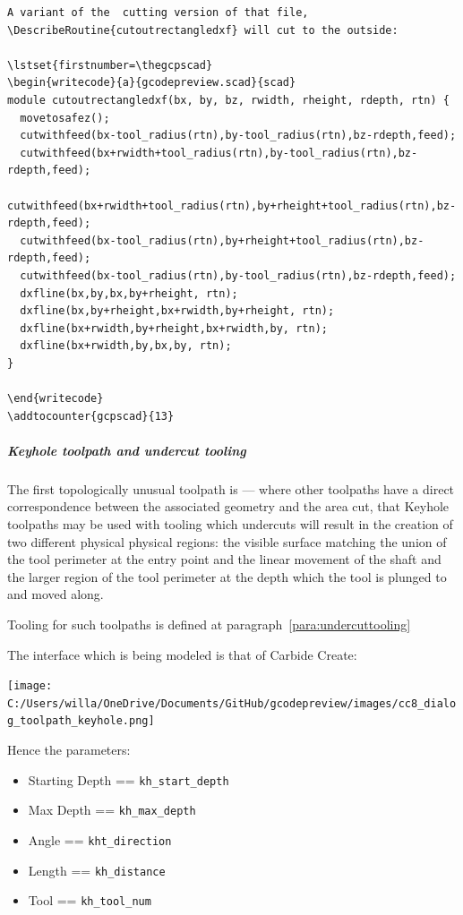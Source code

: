 \documentclass{ltxdoc}
\begin{document}
\begin{verbatim}
A variant of the  cutting version of that file, \DescribeRoutine{cutoutrectangledxf} will cut to the outside:

\lstset{firstnumber=\thegcpscad}
\begin{writecode}{a}{gcodepreview.scad}{scad}
module cutoutrectangledxf(bx, by, bz, rwidth, rheight, rdepth, rtn) {
  movetosafez();
  cutwithfeed(bx-tool_radius(rtn),by-tool_radius(rtn),bz-rdepth,feed);
  cutwithfeed(bx+rwidth+tool_radius(rtn),by-tool_radius(rtn),bz-rdepth,feed);
  cutwithfeed(bx+rwidth+tool_radius(rtn),by+rheight+tool_radius(rtn),bz-rdepth,feed);
  cutwithfeed(bx-tool_radius(rtn),by+rheight+tool_radius(rtn),bz-rdepth,feed);
  cutwithfeed(bx-tool_radius(rtn),by-tool_radius(rtn),bz-rdepth,feed);
  dxfline(bx,by,bx,by+rheight, rtn);
  dxfline(bx,by+rheight,bx+rwidth,by+rheight, rtn);
  dxfline(bx+rwidth,by+rheight,bx+rwidth,by, rtn);
  dxfline(bx+rwidth,by,bx,by, rtn);
}

\end{writecode}
\addtocounter{gcpscad}{13}
\end{verbatim}

\subparagraph{Keyhole toolpath and undercut tooling}
 
\label{subsec:keyholetoolpaths}
The first topologically unusual toolpath is  --- where other toolpaths have a direct correspondence between the associated geometry and the area cut, that Keyhole toolpaths may be used with tooling which undercuts will result in the creation of two different physical physical regions: the visible surface matching the union of the tool perimeter at the entry point and the linear movement of the shaft and the larger region of the tool perimeter at the depth which the tool is plunged to and moved along.
 
Tooling for such toolpaths is defined at paragraph~\ref{para:undercuttooling}

The interface which is being modeled is that of Carbide Create:

\bigskip

\begin{centering}
\texttt{[image: C:/Users/willa/OneDrive/Documents/GitHub/gcodepreview/images/cc8\_dialog\_toolpath\_keyhole.png]}\par
\end{centering}

\bigskip

\noindent Hence the parameters:

\begin{itemize}
\item Starting Depth == \verb|kh_start_depth|
\item Max Depth == \verb|kh_max_depth|
\item Angle == \verb|kht_direction|
\item Length == \verb|kh_distance|
\item Tool == \verb|kh_tool_num|
\end{itemize}
\end{document}
